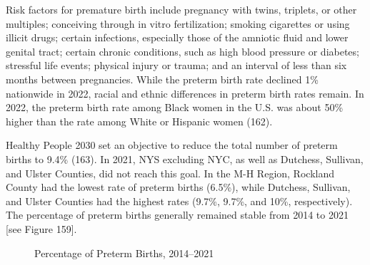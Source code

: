 \documentclass[
  english,
  letterpaper,
]{report}
\begin{document}
Risk factors for premature birth include pregnancy with twins, triplets,
or other multiples; conceiving through in vitro fertilization; smoking
cigarettes or using illicit drugs; certain infections, especially those
of the amniotic fluid and lower genital tract; certain chronic
conditions, such as high blood pressure or diabetes; stressful life
events; physical injury or trauma; and an interval of less than six
months between pregnancies. While the preterm birth rate declined 1\%
nationwide in 2022, racial and ethnic differences in preterm birth rates
remain. In 2022, the preterm birth rate among Black women in the U.S.
was about 50\% higher than the rate among White or Hispanic women (162).

Healthy People 2030 set an objective to reduce the total number of
preterm births to 9.4\% (163). In 2021, NYS excluding NYC, as well as
Dutchess, Sullivan, and Ulster Counties, did not reach this goal. In the
M-H Region, Rockland County had the lowest rate of preterm births
(6.5\%), while Dutchess, Sullivan, and Ulster Counties had the highest
rates (9.7\%, 9.7\%, and 10\%, respectively). The percentage of preterm
births generally remained stable from 2014 to 2021 {[}see Figure 159{]}.

\begin{figure}


\caption{\label{fig-preterm-births-percent}Percentage of Preterm Births,
2014--2021}

\end{figure}%
\end{document}
